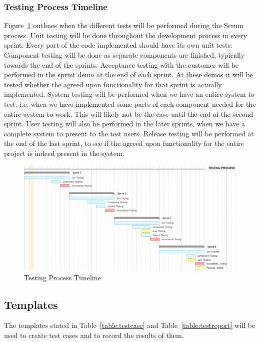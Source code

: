 \subsubsection{Testing Process Timeline}
Figure~\ref{figure:testOutline} outlines when the different tests will be performed during the Scrum process. Unit testing will be done throughout the development process in every sprint. Every part of the code implemented should have its own unit tests. Component testing will be done as separate components are finished, typically towards the end of the sprints. Acceptance testing with the customer will be performed in the sprint demo at the end of each sprint. At these demos it will be tested whether the agreed upon functionality for that sprint is actually implemented. System testing will be performed when we have an entire system to test, i.e. when we have implemented some parts of each component needed for the entire system to work. This will likely not be the case until the end of the second sprint. User testing will also be performed in the later sprints, when we have a complete system to present to the test users. Release testing will be performed at the end of the last sprint, to see if the agreed upon functionality for the entire project is indeed present in the system.

\begin{figure}
\centering
\includegraphics[width=6in]{image/testingProcess.png}
\caption{Testing Process Timeline}
\label{figure:testOutline}
\end{figure}

\subsection{Templates}
The templates stated in Table~\ref{table:testcase} and Table~\ref{table:testreport} will be used to create test cases and to record the results of them.

